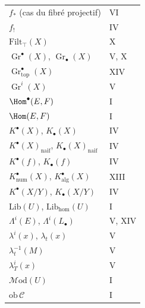 \begin{longtable}{p{7cm}l}
$f_{*}$ (cas du fibr\'e projectif) & VI \\
$f_{!}$ & IV \\
$\mathrm{Filt}_{\top}(X)$ & X \\
$\operatorname{Gr}^{\bullet}(X)$, $\operatorname{Gr}_{\bullet}(X)$ & V, X \\
$\operatorname{Gr}_{\mathrm{top}}^{\bullet}(X)$ & XIV \\
$\operatorname{Gr}^{i}(X)$ & V \\
$\Hom^{\bullet}(E, F)$ & I \\
$\Hom(E, F)$ & I \\
$K^{\bullet}(X)$, $K_{\bullet}(X)$ & IV \\
$K^{\bullet}(X)_{\mathrm{naif}}$, $K_{\bullet}(X)_{\mathrm{naif}}$ & IV \\
$K^{\bullet}(f)$, $K_{\bullet}(f)$ & IV \\
$K^{\bullet}_{\mathrm{num}}(X)$, $K^{\bullet}_{\mathrm{alg}}(X)$ & XIII \\
$K^{\bullet}(X/Y)$, $K_{\bullet}(X/Y)$ & IV \\
$\mathrm{Lib}(U)$, $\mathrm{Lib}_{\mathrm{hom}}(U)$ & I \\
$\Lambda^{i}(E)$, $\Lambda^{i}(L_{\bullet})$ & V, XIV \\
$\lambda^{i}(x)$, $\lambda_{t}(x)$ & V \\
$\lambda_{t}^{-1}(M)$ & V \\
$\lambda^{i}_{T}(x)$ & V \\
$\mathcal{M}\mathrm{od}(U)$ & I \\
$\mathrm{ob}\,\mathcal{C}$ & I \\
\bottomrule
\end{longtable}

\vspace{1cm}

